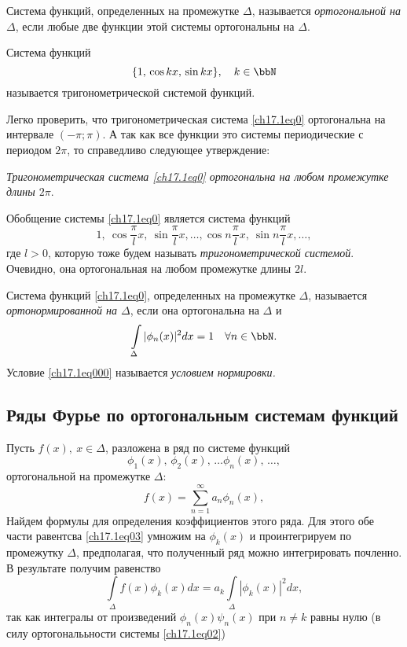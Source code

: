 \begin{defn}
Система функций, определенных на промежутке $\Delta$, называется \textit{ортогональной на $\Delta$}, если любые две функции этой системы ортогональны на $\Delta$.
\end{defn}

\begin{defn}
Система функций 
\begin{equation} \label{ch17.1eq0}
\{1,\, \cos kx,\, \sin kx\}, \quad k\in \bbN
\end{equation}
называется тригонометрической системой функций.			
\end{defn}
Легко проверить, что тригонометрическая система \eqref{ch17.1eq0} ортогональна на интервале $(-\pi;\pi)$. А так как все функции это системы периодические с периодом $2\pi$, то справедливо следующее утверждение:

\textit{Тригонометрическая система \eqref{ch17.1eq0} ортогональна на любом промежутке длины $2\pi$}.	

Обобщение системы \eqref{ch17.1eq0} является система функций
$$
1,\ \cos \frac{\pi}{l}x,\ \sin \frac{\pi}{l}x,\ldots,\cos n\frac{\pi}{l}x,\ \sin n\frac{\pi}{l}x,\ldots,
$$
где $l>0$, которую тоже будем называть \textit{тригонометрической системой}. Очевидно, она ортогональная на любом промежутке длины $2l$.
\begin{defn}
Система функций \eqref{ch17.1eq0}, определенных на промежутке $\Delta$, называется \textit{ортонормированной на $\Delta$}, если она ортогональна на $\Delta$ и 
\begin{equation} \label{ch17.1eq000}
\int \limits_\Delta{|\phi_n(x)|^2dx=1} \quad \forall n \in \bbN.
\end{equation}
Условие \eqref{ch17.1eq000} называется \textit{условием нормировки.}
\end{defn}

\subsection{Ряды Фурье по ортогональным системам функций}

Пусть $f(x),\ x \in \Delta$, разложена в ряд по системе функций
\begin{equation} \label{ch17.1eq02}
\phi_1(x), \,\phi_2(x), \, \ldots \phi_n(x), \,\ldots,
\end{equation}
ортогональной на промежутке $\Delta$:
\begin{equation} \label{ch17.1eq03}
f(x)= \sum_{n = 1}^{\infty} a_n \phi_n(x),
\end{equation}
Найдем формулы для определения коэффициентов этого ряда. Для этого обе части равентсва \eqref{ch17.1eq03} умножим на $\phi_k(x)$ и проинтегрируем по промежутку $\Delta$, предполагая, что полученный ряд можно интегрировать почленно. В результате получим равенство
$$
\int \limits_\Delta{f(x) \phi_k(x)}dx=a_k\int \limits_\Delta|\phi_k(x)|^2dx,
$$
так как интегралы от произведений $\phi_n(x)\psi_n(x)$ при $n\ne k$ равны нулю (в силу ортогональьности системы \eqref{ch17.1eq02})

